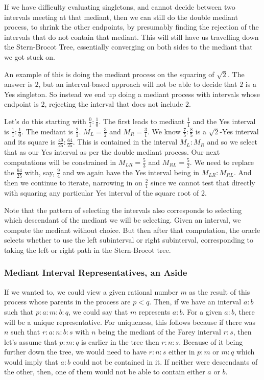\documentclass[12pt]{article}
\begin{document}
If we have difficulty evaluating singletons, and cannot decide between two intervals meeting at that mediant, then we can still do the double mediant process, to shrink the other endpoints, by presumably finding the rejection of the intervals that do not contain that mediant. This will still have us travelling down the Stern-Brocot Tree, essentially converging on both sides to the mediant that we got stuck on. 

An example of this is doing the mediant process on the squaring of $\sqrt{2}$. The answer is $2$, but an interval-based approach will not be able to decide that $2$ is a Yes singleton. So instead we end up doing a mediant process with intervals whose endpoint is $2$, rejecting the interval that does not include $2$. 

Let's do this starting with $\frac{0}{1}:\frac{1}{0}$. The first leads to mediant $\frac{1}{1}$ and the Yes interval is $\frac{1}{1}:\frac{1}{0}$. The mediant is $\frac{2}{1}$. $M_L = \frac{3}{2}$ and $M_R = \frac{3}{1}$. We know $\frac{7}{5}:\frac{8}{5}$ is a $\sqrt{2}$-Yes interval and its square is $\frac{49}{25}:\frac{64}{25}$. This is contained in the interval $M_L:M_R$ and so we select that as our Yes interval as per the double mediant process. Our next computations will be constrained in $M_{LR} = \frac{5}{3}$ and $M_{RL} = \frac{5}{2}$. We need to replace the $\frac{64}{25}$ with, say, $\frac{9}{4}$ and we again have the Yes interval being in $M_{LR}:M_{RL}$. And then we continue to iterate, narrowing in on $\frac{2}{1}$ since we cannot test that directly with squaring any particular Yes interval of the square root of 2. 


Note that the pattern of selecting the intervals also corresponds to selecting which descendant of the mediant we will be selecting. Given an interval, we compute the mediant without choice. But then after that computation, the oracle selects whether to use the left subinterval or right subinterval, corresponding to taking the left or right path in the Stern-Brocot tree.

\subsubsection{Mediant Interval Representatives, an Aside}

If we wanted to, we could view a given rational number $m$ as the result of this process whose parents in the process are $p < q$. Then, if we have an interval $a:b$ such that $p : a : m : b : q$, we could say that $m$ represents $a:b$. For a given $a:b$, there will be a unique representative. For uniqueness, this follows because if there was $n$ such that $r : a: n: b : s$ with $n$ being the mediant of the Farey interval $r:s$, then let's assume that $p:m:q$ is earlier in the tree then $r:n:s$. Because of it being further down the tree, we would need to have $r:n:s$ either in $p:m$ or $m:q$ which would imply that $a:b$ could not be contained in it. If neither were descendants of the other, then, one of them would not be able to contain either $a$ or $b$. 
\end{document}

